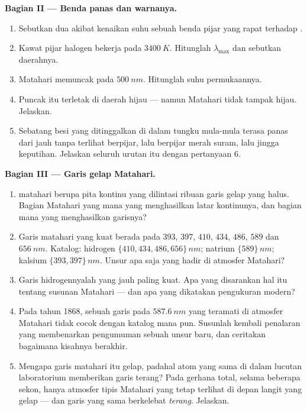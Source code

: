 \begin{problem}
\medskip
\noindent\textbf{Bagian II --- Benda panas dan warnanya.}
\begin{enumerate}[resume]
  \item Sebutkan dua akibat kenaikan suhu sebuah benda pijar yang rapat
        terhadap .
  \item Kawat pijar halogen bekerja pada $\qty{3400}{K}$. Hitunglah
        $\lambda_{\max}$ dan sebutkan daerahnya.
  \item {} Matahari memuncak pada $\qty{500}{nm}$.
        Hitunglah suhu permukaannya.
  \item Puncak itu terletak di daerah hijau --- namun Matahari tidak
        tampak hijau. Jelaskan.
  \item Sebatang besi yang ditinggalkan di dalam tungku mula-mula
        terasa panas dari jauh tanpa terlihat berpijar, lalu berpijar
        merah suram, lalu jingga keputihan. Jelaskan seluruh urutan itu
        dengan pertanyaan 6.
\end{enumerate}

\medskip
\noindent\textbf{Bagian III --- Garis gelap Matahari.}
\begin{enumerate}[resume]
  \item {} matahari berupa pita kontinu yang dilintasi ribuan
        garis gelap yang halus. Bagian Matahari yang mana yang
        menghasilkan latar kontinunya, dan bagian mana yang
        menghasilkan garisnya?
  \item Garis matahari yang kuat berada pada $393$, $397$, $410$,
        $434$, $486$, $589$ dan $\qty{656}{nm}$. Katalog: hidrogen
        $\{410, 434, 486, 656\}\,\unit{nm}$; natrium
        $\{589\}\,\unit{nm}$; kalsium $\{393, 397\}\,\unit{nm}$. Unsur
        apa saja yang hadir di atmosfer Matahari?
  \item Garis hidrogennyalah yang jauh paling kuat. Apa yang
        disarankan hal itu tentang susunan Matahari --- dan apa yang
        dikatakan pengukuran modern?
  \item Pada tahun 1868, sebuah garis pada $\qty{587.6}{nm}$ yang
        teramati di atmosfer Matahari tidak cocok dengan katalog mana
        pun. Susunlah kembali penalaran yang membenarkan pengumuman
        sebuah unsur baru, dan ceritakan bagaimana kisahnya berakhir.
  \item Mengapa garis matahari itu gelap, padahal atom yang sama di
        dalam lucutan laboratorium memberikan garis terang? Pada
        gerhana total, selama beberapa sekon, hanya atmosfer tipis
        Matahari yang tetap terlihat di depan langit yang gelap --- dan
        garis yang sama berkelebat \emph{terang}. Jelaskan.
\end{enumerate}


\end{problem}
